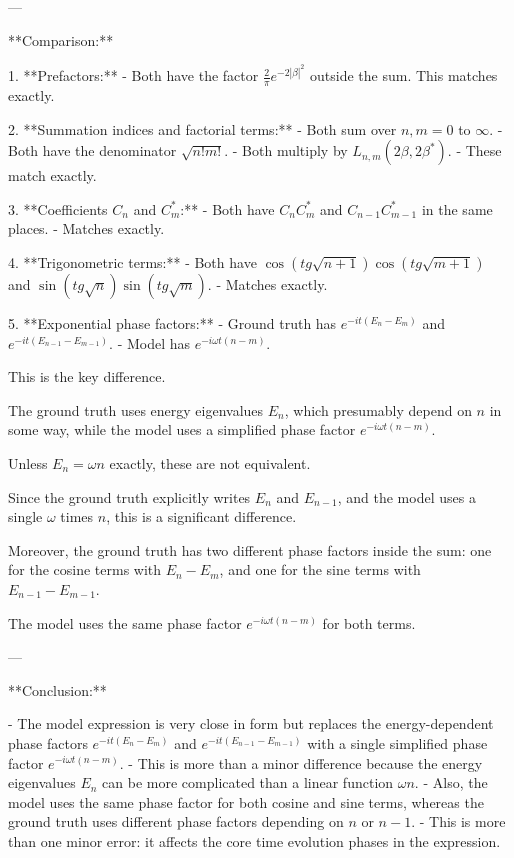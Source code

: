 \documentclass[10pt]{article}
\begin{document}
---

**Comparison:**

1. **Prefactors:**
   - Both have the factor \(\frac{2}{\pi} e^{-2|\beta|^2}\) outside the sum. This matches exactly.

2. **Summation indices and factorial terms:**
   - Both sum over \(n,m=0\) to \(\infty\).
   - Both have the denominator \(\sqrt{n! m!}\).
   - Both multiply by \(L_{n,m}(2\beta, 2\beta^*)\).
   - These match exactly.

3. **Coefficients \(C_n\) and \(C_m^*\):**
   - Both have \(C_n C_m^*\) and \(C_{n-1} C_{m-1}^*\) in the same places.
   - Matches exactly.

4. **Trigonometric terms:**
   - Both have \(\cos(t g \sqrt{n+1}) \cos(t g \sqrt{m+1})\) and \(\sin(t g \sqrt{n}) \sin(t g \sqrt{m})\).
   - Matches exactly.

5. **Exponential phase factors:**
   - Ground truth has \(e^{-i t (E_n - E_m)}\) and \(e^{-i t (E_{n-1} - E_{m-1})}\).
   - Model has \(e^{-i \omega t (n - m)}\).
   
   This is the key difference.

   The ground truth uses energy eigenvalues \(E_n\), which presumably depend on \(n\) in some way, while the model uses a simplified phase factor \(e^{-i \omega t (n - m)}\).

   Unless \(E_n = \omega n\) exactly, these are not equivalent.

   Since the ground truth explicitly writes \(E_n\) and \(E_{n-1}\), and the model uses a single \(\omega\) times \(n\), this is a significant difference.

   Moreover, the ground truth has two different phase factors inside the sum: one for the cosine terms with \(E_n - E_m\), and one for the sine terms with \(E_{n-1} - E_{m-1}\).

   The model uses the same phase factor \(e^{-i \omega t (n - m)}\) for both terms.

---

**Conclusion:**

- The model expression is very close in form but replaces the energy-dependent phase factors \(e^{-i t (E_n - E_m)}\) and \(e^{-i t (E_{n-1} - E_{m-1})}\) with a single simplified phase factor \(e^{-i \omega t (n - m)}\).
- This is more than a minor difference because the energy eigenvalues \(E_n\) can be more complicated than a linear function \(\omega n\).
- Also, the model uses the same phase factor for both cosine and sine terms, whereas the ground truth uses different phase factors depending on \(n\) or \(n-1\).
- This is more than one minor error: it affects the core time evolution phases in the expression.
\end{document}
